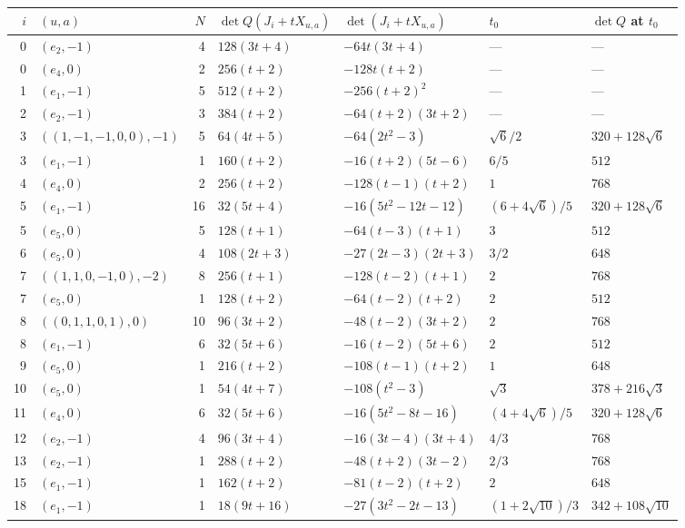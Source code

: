 \documentclass[11pt]{amsart}
\theoremstyle{definition}
\theoremstyle{remark}
\numberwithin{equation}{section}
\numberwithin{table}{section}
\numberwithin{figure}{section}
\begin{document}
\begin{table}[t]
\centering
\small
\renewcommand{\arraystretch}{1.18}
\setlength{\tabcolsep}{4pt}
\begin{tabular}{@{}r l r l l l l@{}}
\toprule
$i$ & $(u,a)$ & $N$ & $\det Q(J_i+tX_{u,a})$ & $\det(J_i+tX_{u,a})$ & $t_0$ & $\det Q$ at $t_0$\\
\midrule
0 & $(e_2,-1)$ & 4 & $128(3t+4)$ & $-64t(3t+4)$ & --- & ---\\
0 & $(e_4,0)$ & 2 & $256(t+2)$ & $-128t(t+2)$ & --- & ---\\
1 & $(e_1,-1)$ & 5 & $512(t+2)$ & $-256(t+2)^2$ & --- & ---\\
2 & $(e_2,-1)$ & 3 & $384(t+2)$ & $-64(t+2)(3t+2)$ & --- & ---\\
3 & $((1,-1,-1,0,0),-1)$ & 5 & $64(4t+5)$ & $-64(2t^2-3)$ & $\sqrt6/2$ & $320+128\sqrt6$\\
3 & $(e_1,-1)$ & 1 & $160(t+2)$ & $-16(t+2)(5t-6)$ & $6/5$ & $512$\\
4 & $(e_4,0)$ & 2 & $256(t+2)$ & $-128(t-1)(t+2)$ & $1$ & $768$\\
5 & $(e_1,-1)$ & 16 & $32(5t+4)$ & $-16(5t^2-12t-12)$ & $(6+4\sqrt6)/5$ & $320+128\sqrt6$\\
5 & $(e_5,0)$ & 5 & $128(t+1)$ & $-64(t-3)(t+1)$ & $3$ & $512$\\
6 & $(e_5,0)$ & 4 & $108(2t+3)$ & $-27(2t-3)(2t+3)$ & $3/2$ & $648$\\
7 & $((1,1,0,-1,0),-2)$ & 8 & $256(t+1)$ & $-128(t-2)(t+1)$ & $2$ & $768$\\
7 & $(e_5,0)$ & 1 & $128(t+2)$ & $-64(t-2)(t+2)$ & $2$ & $512$\\
8 & $((0,1,1,0,1),0)$ & 10 & $96(3t+2)$ & $-48(t-2)(3t+2)$ & $2$ & $768$\\
8 & $(e_1,-1)$ & 6 & $32(5t+6)$ & $-16(t-2)(5t+6)$ & $2$ & $512$\\
9 & $(e_5,0)$ & 1 & $216(t+2)$ & $-108(t-1)(t+2)$ & $1$ & $648$\\
10 & $(e_5,0)$ & 1 & $54(4t+7)$ & $-108(t^2-3)$ & $\sqrt3$ & $378+216\sqrt3$\\
11 & $(e_4,0)$ & 6 & $32(5t+6)$ & $-16(5t^2-8t-16)$ & $(4+4\sqrt6)/5$ & $320+128\sqrt6$\\
12 & $(e_2,-1)$ & 4 & $96(3t+4)$ & $-16(3t-4)(3t+4)$ & $4/3$ & $768$\\
13 & $(e_2,-1)$ & 1 & $288(t+2)$ & $-48(t+2)(3t-2)$ & $2/3$ & $768$\\
15 & $(e_1,-1)$ & 1 & $162(t+2)$ & $-81(t-2)(t+2)$ & $2$ & $648$\\
18 & $(e_1,-1)$ & 1 & $18(9t+16)$ & $-27(3t^2-2t-13)$ & $(1+2\sqrt{10})/3$ & $342+108\sqrt{10}$\\

\end{tabular}
\end{table}
\end{document}
